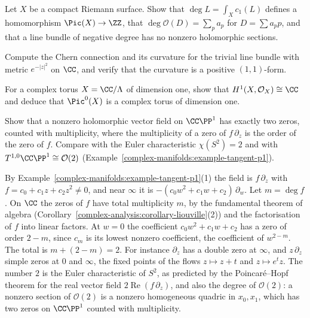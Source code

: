 \begin{exercise}\label{complex-manifolds:exercise-degree-line-bundle}
Let $X$ be a compact Riemann surface. Show that $\deg L = \int_Xc_1(L)$ defines a homomorphism $\Pic(X) \to \ZZ$, that $\deg\mathcal{O}(D) = \sum_pa_p$ for $D = \sum a_pp$, and that a line bundle of negative
degree has no nonzero holomorphic sections.
\end{exercise}

\begin{exercise}\label{complex-manifolds:exercise-chern-connection-trivial}
Compute the Chern connection and its curvature for the trivial line bundle with metric $e^{-|z|^2}$ on $\CC$, and verify that the curvature is a positive $(1,1)$-form.
\end{exercise}

\begin{exercise}\label{complex-manifolds:exercise-picard-torus}
For a complex torus $X = \CC/\Lambda$ of dimension one, show that $H^1(X, \mathcal{O}_X) \cong \CC$ and deduce that $\Pic^0(X)$ is a complex torus of dimension one.
\end{exercise}

\begin{exercise}\label{complex-manifolds:exercise-zeros-vector-field}
Show that a nonzero holomorphic vector field on $\CC\PP^1$ has exactly two zeros, counted with multiplicity, where the multiplicity of a zero of $f\,\partial_z$ is the order of the zero of $f$. Compare with the Euler
characteristic $\chi(S^2) = 2$ and with $T^{1,0}\CC\PP^1 \cong \mathcal{O}(2)$ (Example~\ref{complex-manifolds:example-tangent-p1}).
\end{exercise}

\begin{solution}
By Example~\ref{complex-manifolds:example-tangent-p1}(1) the field is $f\,\partial_z$ with $f = c_0 + c_1z + c_2z^2 \neq 0$, and near $\infty$ it is $-(c_0w^2 + c_1w + c_2)\,\partial_w$. Let $m = \deg f$. On $\CC$ the zeros of $f$
have total multiplicity $m$, by the fundamental theorem of algebra (Corollary~\ref{complex-analysis:corollary-liouville}(2)) and the factorisation of $f$ into linear factors. At $w = 0$ the coefficient
$c_0w^2 + c_1w + c_2$ has a zero of order $2 - m$, since $c_m$ is its lowest nonzero coefficient, the coefficient of $w^{2-m}$. The total is $m + (2 - m) = 2$. For instance $\partial_z$ has a double zero at $\infty$, and
$z\,\partial_z$ simple zeros at $0$ and $\infty$, the fixed points of the flows $z \mapsto z + t$ and $z \mapsto e^tz$. The number $2$ is the Euler characteristic of $S^2$, as predicted by the Poincar\'e--Hopf theorem
for the real vector field $2\operatorname{Re}(f\,\partial_z)$, and also the degree of $\mathcal{O}(2)$: a nonzero section of $\mathcal{O}(2)$ is a nonzero homogeneous quadric in $x_0, x_1$, which has two zeros on
$\CC\PP^1$ counted with multiplicity.
\end{solution}

